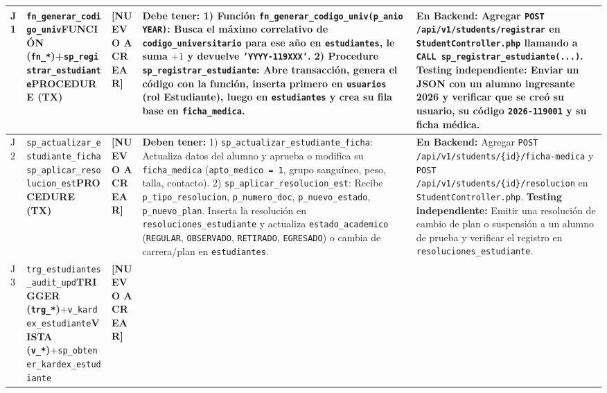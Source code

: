 \documentclass[10pt,a4paper,landscape]{article}
\newcommand{\stNuevo}{\textbf{\textcolor{red!75!black}{[NUEVO A CREAR]}}}
\newcommand{\objProcTx}{\textbf{\textcolor{unjbgNavy}{PROCEDURE (TX)}}}
\newcommand{\objFunc}{\textbf{\textcolor{teal!80!black}{FUNCIÓN (\texttt{fn\_*})}}}
\newcommand{\objTrig}{\textbf{\textcolor{orange!80!black}{TRIGGER (\texttt{trg\_*})}}}
\newcommand{\objView}{\textbf{\textcolor{violet!85!black}{VISTA (\texttt{v\_*})}}}
\begin{document}
\begin{longtable}{|p{0.5cm}|p{3.8cm}|p{2.9cm}|p{8.8cm}|p{9.2cm}|}
J1 & \texttt{fn\_generar\_codigo\_univ}\newline \objFunc\newline +\newline \texttt{sp\_registrar\_estudiante}\newline \objProcTx & \stNuevo & 
\textbf{Debe tener:}
1) \textbf{Función \texttt{fn\_generar\_codigo\_univ(p\_anio YEAR)}:} Busca el máximo correlativo de \texttt{codigo\_universitario} para ese año en \texttt{estudiantes}, le suma $+1$ y devuelve \texttt{'YYYY-119XXX'}.
2) \textbf{Procedure \texttt{sp\_registrar\_estudiante}:} Abre transacción, genera el código con la función, inserta primero en \texttt{usuarios} (rol Estudiante), luego en \texttt{estudiantes} y crea su fila base en \texttt{ficha\_medica}. & 
\textbf{En Backend:} Agregar \texttt{POST /api/v1/students/registrar} en \texttt{StudentController.php} llamando a \texttt{CALL sp\_registrar\_estudiante(...)}.\newline
\textbf{Testing independiente:} Enviar un JSON con un alumno ingresante 2026 y verificar que se creó su usuario, su código \texttt{2026-119001} y su ficha médica. \\
\hline
\rowcolor{rowAlt}
J2 & \texttt{sp\_actualizar\_estudiante\_ficha}\newline \texttt{sp\_aplicar\_resolucion\_est}\newline \objProcTx & \stNuevo & 
\textbf{Deben tener:}
1) \texttt{sp\_actualizar\_estudiante\_ficha}: Actualiza datos del alumno y aprueba o modifica su \texttt{ficha\_medica} (\texttt{apto\_medico = 1}, grupo sanguíneo, peso, talla, contacto).
2) \texttt{sp\_aplicar\_resolucion\_est}: Recibe \texttt{p\_tipo\_resolucion}, \texttt{p\_numero\_doc}, \texttt{p\_nuevo\_estado}, \texttt{p\_nuevo\_plan}. Inserta la resolución en \texttt{resoluciones\_estudiante} y actualiza \texttt{estado\_academico} (\texttt{REGULAR}, \texttt{OBSERVADO}, \texttt{RETIRADO}, \texttt{EGRESADO}) o cambia de carrera/plan en \texttt{estudiantes}. & 
\textbf{En Backend:} Agregar \texttt{POST /api/v1/students/\{id\}/ficha-medica} y \texttt{POST /api/v1/students/\{id\}/resolucion} en \texttt{StudentController.php}.\newline
\textbf{Testing independiente:} Emitir una resolución de cambio de plan o suspensión a un alumno de prueba y verificar el registro en \texttt{resoluciones\_estudiante}. \\
\hline
J3 & \texttt{trg\_estudiantes\_audit\_upd}\newline \objTrig\newline +\newline \texttt{v\_kardex\_estudiante}\newline \objView\newline +\newline \texttt{sp\_obtener\_kardex\_estudiante} & \stNuevo & 

\end{longtable}
\end{document}
